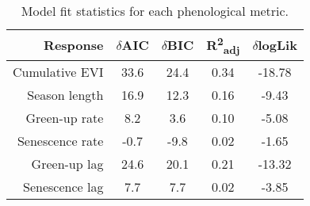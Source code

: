 \begin{table}[H]
\centering
\begin{tabular}{rcccc}
  \hline
Response & $\delta$AIC & $\delta$BIC & R\textsuperscript{2}\textsubscript{adj} & $\delta$logLik \\ 
  \hline
Cumulative EVI & 33.6 & 24.4 & 0.34 & -18.78 \\ 
  Season length & 16.9 & 12.3 & 0.16 & -9.43 \\ 
  Green-up rate & 8.2 & 3.6 & 0.10 & -5.08 \\ 
  Senescence rate & -0.7 & -9.8 & 0.02 & -1.65 \\ 
  Green-up lag & 24.6 & 20.1 & 0.21 & -13.32 \\ 
  Senescence lag & 7.7 & 7.7 & 0.02 & -3.85 \\ 
   \hline
\end{tabular}
\caption{Model fit statistics for each phenological metric.} 
\label{mod_stat}
\end{table}

